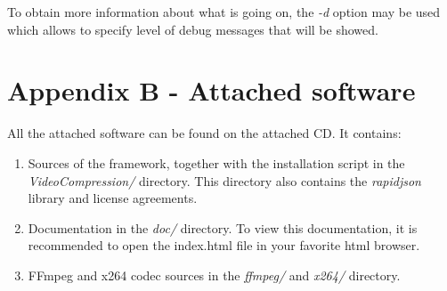 To obtain more information about what is going on, the \textit{-d} option may be used which allows to specify level of debug messages that will be showed.
\section*{Appendix B - Attached software}
All the attached software can be found on the attached CD. It contains:
\begin{enumerate}
\item Sources of the framework, together with the installation script in the \textit{VideoCompression/} directory. This directory also contains the \textit{rapidjson} library and license agreements.
\item Documentation in the \textit{doc/} directory. To view this documentation, it is recommended to open the index.html file in your favorite html browser.
\item FFmpeg and x264 codec sources in the \textit{ffmpeg/} and \textit{x264/} directory.
\end{enumerate} 
\openright